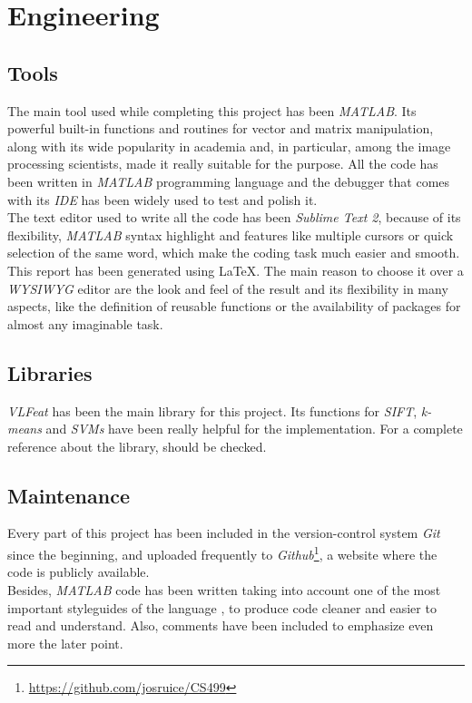 
\section{Engineering}

\subsection{Tools}
The main tool used while completing this project has been \emph{MATLAB}. Its  powerful built-in functions and routines for vector and matrix manipulation, along with its wide popularity in academia and, in particular, among the image processing scientists, made it really suitable for the purpose. All the code has been written in \emph{MATLAB} programming language and the debugger that comes with its \emph{IDE} has been widely used to test and polish it. \\

The text editor used to write all the code has been \emph{Sublime Text 2}, because of its flexibility, \emph{MATLAB} syntax highlight and features like multiple cursors or quick selection of the same word, which make the coding task much easier and smooth. \\

This report has been generated using \LaTeX. The main reason to choose it over a \emph{WYSIWYG} editor are the look and feel of the result and its flexibility in many aspects, like the definition of reusable functions or the availability of packages for almost any imaginable task. 


\subsection{Libraries}
\emph{VLFeat} has been the main library for this project. Its functions for \emph{SIFT}, \emph{k-means} and \emph{SVMs} have been really helpful for the implementation. For a complete reference about the library, \cite{Vedaldi_2010_VLFEAT} should be checked. 


\subsection{Maintenance}
Every part of this project has been included in the version-control system \emph{Git} since the beginning, and uploaded frequently to \emph{Github}\footnote{\url{https://github.com/josruice/CS499}}, a website where the code is publicly available. \\

Besides, \emph{MATLAB} code has been written taking into account one of the most important styleguides of the language \cite{Johnson_2002_MPS}, to produce code cleaner and easier to read and understand. Also, comments have been included to emphasize even more the later point. 



